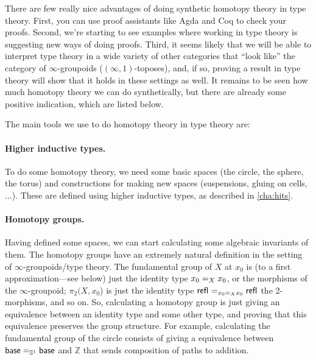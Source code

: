 There are few really nice advantages of doing synthetic homotopy theory
in type theory.  First, you can use proof assistants like Agda and Coq
to check your proofs.  Second, we're starting to see examples where
working in type theory is suggesting new ways of doing proofs.  Third,
it seems likely that we will be able to interpret type theory in a wide
variety of other categories that ``look like'' the category of
$\infty$-groupoids ($(\infty,1)$-toposes), and, if so, proving a result
in type theory will show that it holds in these settings as well. It
remains to be seen how much homotopy theory we can do synthetically, but
there are already some positive indication, which are listed below.

The main tools we use to do homotopy theory in type theory are:

\paragraph{Higher inductive types.} To do some homotopy theory, we need some
  basic spaces (the circle, the sphere, the torus) and constructions for
  making new spaces (suspensions, gluing on cells, ...).  These are
  defined using higher inductive types, as described in
  \autoref{cha:hits}.

\paragraph{Homotopy groups.}  Having defined some spaces, we can start
  calculating some algebraic invariants of them.  The homotopy groups
  have an extremely natural definition in the setting of
  $\infty$-groupoids/type theory.  The fundamental group of $X$ at $x_0$
  is (to a first approximation---see below) just the identity type
  $\id[X] {x_0} {x_0}$, or the morphisms of the $\infty$-groupoid;
  $\pi_2(X,x_0$) is just the identity type $\id[{\id[X] {x_0} {x_0}}]
  {\refl{}}{\refl{}}$ the 2-morphisms, and so on.  So, calculating a
  homotopy group is just giving an equivalence between an identity type
  and some other type, and proving that this equivalence preserves the
  group structure.  For example, calculating the fundamental group of
  the circle consists of giving a equivalence between $\id[{\Sn ^1}]
  \base \base$ and $\mathbb{Z}$ that sends composition of paths to
  addition.

